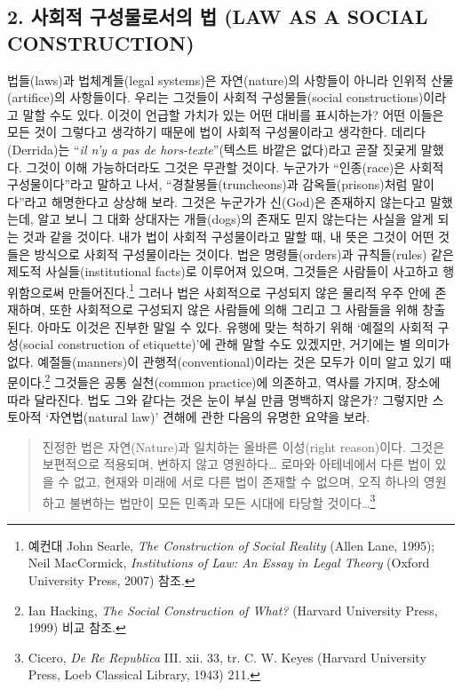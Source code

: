 \subsection{2. 사회적 구성물로서의 법 (LAW AS A SOCIAL
CONSTRUCTION)}\label{uxc0acuxd68cuxc801-uxad6cuxc131uxbb3cuxb85cuxc11cuxc758-uxbc95-law-as-a-social-construction}

법들(laws)과 법체계들(legal systems)은 자연(nature)의 사항들이 아니라
인위적 산물(artifice)의 사항들이다. 우리는 그것들이 사회적
구성물들(social constructions)이라고 말할 수도 있다. 이것이 언급할
가치가 있는 어떤 대비를 표시하는가? 어떤 이들은 모든 것이 그렇다고
생각하기 때문에 법이 사회적 구성물이라고 생각한다. 데리다(Derrida)는
“\emph{il n'y a pas de hors-texte}”(텍스트 바깥은 없다)라고 곧잘
짓궂게 말했다. 그것이 이해 가능하더라도 그것은 무관할 것이다. 누군가가
“인종(race)은 사회적 구성물이다”라고 말하고 나서,
“경찰봉들(truncheons)과 감옥들(prisons)처럼 말이다”라고 해명한다고
상상해 보라. 그것은 누군가가 신(God)은 존재하지 않는다고 말했는데, 알고
보니 그 대화 상대자는 개들(dogs)의 존재도 믿지 않는다는 사실을 알게 되는
것과 같을 것이다. 내가 법이 사회적 구성물이라고 말할 때, 내 뜻은 그것이
어떤 것들은  방식으로 사회적 구성물이라는 것이다. 법은
명령들(orders)과 규칙들(rules) 같은 제도적 사실들(institutional facts)로
이루어져 있으며, 그것들은 사람들이 사고하고 행위함으로써
만들어진다.\footnote{예컨대 John Searle, \emph{The Construction of
  Social Reality} (Allen Lane, 1995); Neil MacCormick,
  \emph{Institutions of Law: An Essay in Legal Theory} (Oxford
  University Press, 2007) 참조.} 그러나 법은 사회적으로 구성되지 않은
물리적 우주 안에 존재하며, 또한 사회적으로 구성되지 않은 사람들에 의해
그리고 그 사람들을 위해 창출된다. 아마도 이것은 진부한 말일 수 있다.
유행에 맞는 척하기 위해 ‘예절의 사회적 구성(social construction of
etiquette)’에 관해 말할 수도 있겠지만, 거기에는 별 의미가 없다.
예절들(manners)이 관행적(conventional)이라는 것은 모두가 이미 알고 있기
때문이다.\footnote{Ian Hacking, \emph{The Social Construction of What?}
  (Harvard University Press, 1999) 비교 참조.} 그것들은 공통 실천(common
practice)에 의존하고, 역사를 가지며, 장소에 따라 달라진다. 법도 그와
같다는 것은 눈이 부실 만큼 명백하지 않은가? 그렇지만 스토아적
‘자연법(natural law)’ 견해에 관한 다음의 유명한 요약을 보라.

\begin{quote}
진정한 법은 자연(Nature)과 일치하는 올바른 이성(right reason)이다.
그것은 보편적으로 적용되며, 변하지 않고 영원하다\ldots{} 로마와
아테네에서 다른 법이 있을 수 없고, 현재와 미래에 서로 다른 법이 존재할
수 없으며, 오직 하나의 영원하고 불변하는 법만이 모든 민족과 모든 시대에
타당할 것이다\ldots{}\footnote{Cicero, \emph{De Re Republica} III. xii.
  33, tr. C. W. Keyes (Harvard University Press, Loeb Classical Library,
  1943) 211.}
\end{quote}

